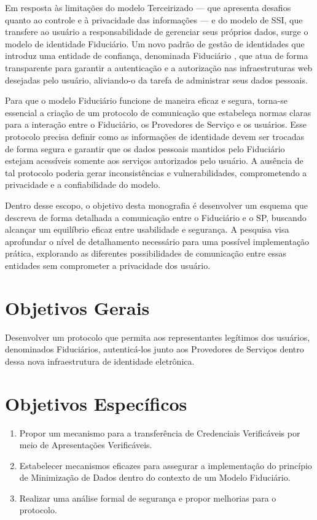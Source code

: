 Em resposta às limitações do modelo Terceirizado — que apresenta desafios quanto ao controle e à privacidade das informações — e do modelo de \acs{SSI}, que transfere ao usuário a responsabilidade de gerenciar seus próprios dados, surge o modelo de identidade Fiduciário. Um novo padrão de gestão de identidades que introduz uma entidade de confiança, denominada Fiduciário \cite{fiduciary}, que atua de forma transparente para garantir a autenticação e a autorização nas infraestruturas web desejadas pelo usuário, aliviando-o da tarefa de administrar seus dados pessoais.

Para que o modelo Fiduciário funcione de maneira eficaz e segura, torna-se essencial a criação de um protocolo de comunicação que estabeleça normas claras para a interação entre o Fiduciário, os Provedores de Serviço e os usuários. Esse protocolo precisa definir como as informações de identidade devem ser trocadas de forma segura e garantir que os dados pessoais mantidos pelo Fiduciário estejam acessíveis somente aos serviços autorizados pelo usuário. A ausência de tal protocolo poderia gerar inconsistências e vulnerabilidades, comprometendo a privacidade e a confiabilidade do modelo.

Dentro desse escopo, o objetivo desta monografia é desenvolver um esquema que descreva de forma detalhada a comunicação entre o Fiduciário e o \acs{SP}, buscando alcançar um equilíbrio eficaz entre usabilidade e segurança. A pesquisa visa aprofundar o nível de detalhamento necessário para uma possível implementação prática, explorando as diferentes possibilidades de comunicação entre essas entidades sem comprometer a privacidade dos usuário.

\section{Objetivos Gerais}\label{section:objetivos-gerais}
Desenvolver um protocolo que permita aos representantes legítimos dos usuários, denominados Fiduciários, autenticá-los junto aos Provedores de Serviços dentro dessa nova infraestrutura de identidade eletrônica.


\section{Objetivos Específicos}\label{section:objetivos-especificos}

\begin{enumerate}[label=\textbf{\roman*.}]

    \item Propor um mecanismo para a transferência de Credenciais Verificáveis por meio de Apresentações Verificáveis.
    
    \item Estabelecer mecanismos eficazes para assegurar a implementação do princípio de Minimização de Dados dentro do contexto de um Modelo Fiduciário.

    \item Realizar uma análise formal de segurança e propor melhorias para o protocolo.

\end{enumerate}

